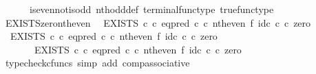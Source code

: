 \begin{isabellebody}
\ \ \ \ \ \ is{\isacharunderscore}{\kern0pt}even{\isacharunderscore}{\kern0pt}not{\isacharunderscore}{\kern0pt}is{\isacharunderscore}{\kern0pt}odd\ nth{\isacharunderscore}{\kern0pt}odd{\isacharunderscore}{\kern0pt}def{}\ terminal{\isacharunderscore}{\kern0pt}func{\isacharunderscore}{\kern0pt}type\ true{\isacharunderscore}{\kern0pt}func{\isacharunderscore}{\kern0pt}type{\isacharparenright}{\kern0pt}%
\endisatagproof
{\isafoldproof}%
%
\isadelimproof
\isanewline
%
\endisadelimproof
\isanewline
{}\isamarkupfalse%
\ EXISTS{\isacharunderscore}{\kern0pt}zero{\isacharunderscore}{\kern0pt}nth{\isacharunderscore}{\kern0pt}even{\isacharcolon}{\kern0pt}\isanewline
\ \ {\isachardoublequoteopen}{\isacharparenleft}{\kern0pt}EXISTS\ {\isasymnat}\isactrlsub c\ {\isasymcirc}\isactrlsub c\ {\isacharparenleft}{\kern0pt}eq{\isacharunderscore}{\kern0pt}pred\ {\isasymnat}\isactrlsub c\ {\isasymcirc}\isactrlsub c\ nth{\isacharunderscore}{\kern0pt}even\ {\isasymtimes}\isactrlsub f\ id\isactrlsub c\ {\isasymnat}\isactrlsub c{\isacharparenright}{\kern0pt}\isactrlsup {\isasymsharp}{\isacharparenright}{\kern0pt}\ {\isasymcirc}\isactrlsub c\ zero\ {\isacharequal}{\kern0pt}\ {\isasymt}{\isachardoublequoteclose}\isanewline
%
\isadelimproof
%
\endisadelimproof
%
\isatagproof
{}\isamarkupfalse%
\ {\isacharminus}{\kern0pt}\isanewline
\ \ \isamarkupfalse%
\ \ {\isachardoublequoteopen}{\isacharparenleft}{\kern0pt}EXISTS\ {\isasymnat}\isactrlsub c\ {\isasymcirc}\isactrlsub c\ {\isacharparenleft}{\kern0pt}eq{\isacharunderscore}{\kern0pt}pred\ {\isasymnat}\isactrlsub c\ {\isasymcirc}\isactrlsub c\ nth{\isacharunderscore}{\kern0pt}even\ {\isasymtimes}\isactrlsub f\ id\isactrlsub c\ {\isasymnat}\isactrlsub c{\isacharparenright}{\kern0pt}\isactrlsup {\isasymsharp}{\isacharparenright}{\kern0pt}\ {\isasymcirc}\isactrlsub c\ zero\isanewline
\ \ \ \ \ \ {\isacharequal}{\kern0pt}\ EXISTS\ {\isasymnat}\isactrlsub c\ {\isasymcirc}\isactrlsub c\ {\isacharparenleft}{\kern0pt}eq{\isacharunderscore}{\kern0pt}pred\ {\isasymnat}\isactrlsub c\ {\isasymcirc}\isactrlsub c\ nth{\isacharunderscore}{\kern0pt}even\ {\isasymtimes}\isactrlsub f\ id\isactrlsub c\ {\isasymnat}\isactrlsub c{\isacharparenright}{\kern0pt}\isactrlsup {\isasymsharp}\ {\isasymcirc}\isactrlsub c\ zero{\isachardoublequoteclose}\isanewline
\ \ \ \ \isamarkupfalse%
\ {\isacharparenleft}{\kern0pt}typecheck{\isacharunderscore}{\kern0pt}cfuncs{\isacharcomma}{\kern0pt}\ simp\ add{\isacharcolon}{\kern0pt}\ comp{\isacharunderscore}{\kern0pt}associative{}{\isacharparenright}{\kern0pt}\isanewline

\end{isabellebody}
